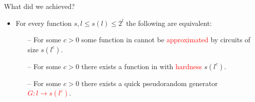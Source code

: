 \documentclass[xcolor={table,dvipsnames,usenames}]{beamer}
\begin{document}
\begin{frame}{What did we achieved?}
\begin{itemize}
	\item  For every function $s, l \leq s(l) \leq 2^l$ the following are equivalent:
	\pause
	\begin{itemize}
		\item[--] For some $c > 0$ some function in {\EXPTIME} cannot be \textcolor{red}{approximated} by circuits of	size $s(l^c)$.
		\pause
		\item[--] For some $c > 0$ there exists a function in {\EXPTIME} with \textcolor{red}{hardness} $s(l^c)$.
		\pause
		\item[--] For some $c > 0$ there exists a quick pseudorandom generator \textcolor{red}{$G:l \rightarrow s(l^c)$}.
	\end{itemize}
\end{itemize}
\end{frame}
\end{document}

